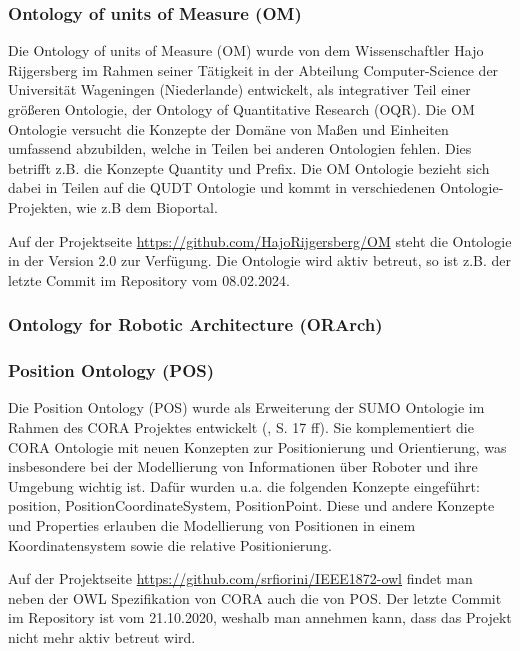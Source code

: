 \documentclass{article}
\begin{document}
\subsubsection{Ontology of units of Measure (OM)}

Die Ontology of units of Measure (OM) wurde von dem Wissenschaftler Hajo Rijgersberg im Rahmen seiner Tätigkeit in der Abteilung Computer-Science der Universität Wageningen (Niederlande) entwickelt, als integrativer Teil einer größeren Ontologie\cite{rijgersberg2013ontology}, der Ontology of Quantitative Research (OQR).
Die OM Ontologie versucht die Konzepte der Domäne von Maßen und Einheiten umfassend abzubilden, welche in Teilen bei anderen Ontologien fehlen. Dies betrifft z.B. die Konzepte Quantity und Prefix. Die OM Ontologie bezieht sich dabei in Teilen auf die QUDT Ontologie und kommt in verschiedenen Ontologie-Projekten, wie z.B dem Bioportal\cite{OM_BioPortal}.

Auf der Projektseite \url{https://github.com/HajoRijgersberg/OM} steht die Ontologie in der Version 2.0 zur Verfügung. Die Ontologie wird aktiv betreut, so ist z.B. der letzte Commit im Repository vom 08.02.2024.

\subsubsection{Ontology for Robotic Architecture (ORArch)}

\cite{kumar2019ontologies}

\subsubsection{Position Ontology (POS)}


Die Position Ontology (POS) wurde als Erweiterung der SUMO Ontologie im Rahmen des CORA Projektes entwickelt (\cite{fiorini2015extensions}, S. 17 ff).
Sie komplementiert die CORA Ontologie mit neuen Konzepten zur Positionierung und Orientierung, was insbesondere bei der Modellierung von Informationen über Roboter und ihre Umgebung wichtig ist.
Dafür wurden u.a. die folgenden Konzepte eingeführt: position, PositionCoordinateSystem, PositionPoint.
Diese und andere Konzepte und Properties erlauben die Modellierung von Positionen in einem Koordinatensystem sowie die relative Positionierung.

Auf der Projektseite \url{https://github.com/srfiorini/IEEE1872-owl} findet man neben der OWL Spezifikation von CORA auch die von POS. Der letzte Commit im Repository ist vom 21.10.2020, weshalb man annehmen kann, dass das Projekt nicht mehr aktiv betreut wird.
\end{document}

